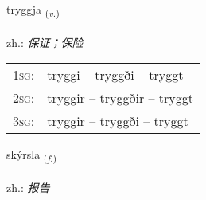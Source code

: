 \documentclass[frontgrid, backgrid]{flacards}\usepackage[]{graphicx}\usepackage[]{xcolor}
\begin{document}
\renewcommand{\flhead}{\vskip5pt \fboxsep=0pt {\small\bfseries\footnotesize Sagnorð | 动词}}
\renewcommand{\fcfoot}{\vskip5pt \fboxsep=0pt \hspace{2pt}{\small\bfseries\footnotesize 1K}}

\renewcommand{\blhead}{\vskip5pt {\small\bfseries\footnotesize Sagnorð | 动词 }}
\renewcommand{\bcfoot}{\vskip5pt \hspace{2pt}{\small\bfseries\footnotesize 1K}}


{tryggja \small{\textsubscript{(\textit{v.})}} \\[1ex] %
\textphonetic{[tʰrɪca]} \\
zh.: \emph{保证；保险} \\  [2ex]
\renewcommand*{\arraystretch}{0.8}
\begin{tabular}{p{1cm}l}
\textsc{1sg}: & tryggi -- tryggði -- tryggt \\ 
\textsc{2sg}: & tryggir -- tryggðir -- tryggt \\ 
\textsc{3sg}: & tryggir -- tryggði -- tryggt \\ 
\end{tabular}
}

\renewcommand{\flhead}{\vskip5pt \fboxsep=0pt {\small\bfseries\footnotesize Nafnorð | 名词}}
\renewcommand{\fcfoot}{\vskip5pt \fboxsep=0pt \hspace{2pt}{\small\bfseries\footnotesize 1K}}

\renewcommand{\blhead}{\vskip5pt {\small\bfseries\footnotesize Nafnorð | 名词 }}
\renewcommand{\bcfoot}{\vskip5pt \hspace{2pt}{\small\bfseries\footnotesize 1K}}


{skýrsla \small{\textsubscript{(\textit{f.})}} \\[1ex] %
 \\
zh.: \emph{报告} \\  [2ex]
\renewcommand*{\arraystretch}{0.8}
}
\end{document}

